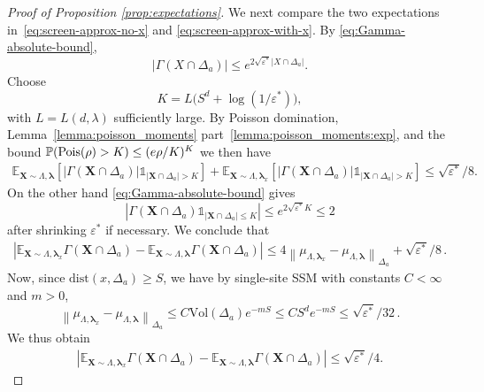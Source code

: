 \documentclass[10pt]{amsart}
\theoremstyle{definition}
\theoremstyle{remark}
\newcommand{\ind}[1]{\mathds{1}_{#1}}
\newcommand{\Pois}{\textup{Pois}}
\newcommand{\bX}{\mathbf{X}}
\newcommand{\dist}{\mathrm{dist}}
\renewcommand{\P}{\mathbb{P}}
\newcommand{\E}{\mathbb{E}}
\newcommand{\region}{\Lambda}
\newcommand{\activities}{\pmb{\lambda}}
\newcommand{\vol}{\mathrm{Vol}}
\newcommand{\absolute}[1]{\left\lvert#1\right\rvert}
\newcommand{\epsbound}{\varepsilon^{*}}
\begin{document}
\begin{proof}[Proof of Proposition \ref{prop:expectations}]
		We next compare the two expectations in~\eqref{eq:screen-approx-no-x} and \eqref{eq:screen-approx-with-x}. By \eqref{eq:Gamma-absolute-bound},
		\[
		|\Gamma(X\cap\Delta_a)|\le e^{2\sqrt{\epsbound} \absolute{X\cap\Delta_a}}.
		\]
		Choose
		\[
		K=L\big(S^d+\log(1/\epsbound)\big),
		\]
		with \(L=L(d,\lambda)\) sufficiently large. By Poisson domination, Lemma~\ref{lemma:poisson_moments} part~\ref{lemma:poisson_moments:exp}, and the bound
		\(
		\P(\Pois(\rho)>K)\leq (e\rho/K)^K
		\)
		we then have
		\begin{align}\label{eq:screen-tail}
			\E_{\bX\sim\region,\activities}
			\left[
			|\Gamma(\bX\cap\Delta_a)|
			\ind{\absolute{\bX\cap\Delta_a}>K}
			\right]
			+
			\E_{\bX\sim\region,\activities_x}
			\left[
			|\Gamma(\bX\cap\Delta_a)|
			\ind{\absolute{\bX\cap\Delta_a}>K}
			\right]
			\le
			\sqrt{\epsbound}/8 .
		\end{align}
		On the other hand \eqref{eq:Gamma-absolute-bound} gives
		\[
		\absolute{\Gamma(\bX\cap\Delta_a)\ind{\absolute{\bX\cap\Delta_a}\leq K}}
		\le
		e^{2\sqrt{\epsbound} K}
		\le 2
		\]
		after shrinking \(\epsbound\) if necessary. 
		We conclude that
		\begin{align*}
			\absolute{
				\E_{\bX\sim\region,\activities_x}
				\Gamma(\bX\cap\Delta_a)
				-
				\E_{\bX\sim\region,\activities}
				\Gamma(\bX\cap\Delta_a)
			}
			\le
			4
			\left\|{
				\mu_{\region,\activities_x}
				-
				\mu_{\region,\activities}
			}\right\|_{\Delta_a}
			+
			\sqrt{\epsbound}/8\, .
		\end{align*}
		Now, since \(\dist(x,\Delta_a)\ge S\), we have by single-site SSM with constants $C < \infty$ and $m > 0$,
		\[
		\left\|{
			\mu_{\region,\activities_x}
			-
			\mu_{\region,\activities}}\right\|_{\Delta_a}
		\le
		C\vol(\Delta_a)e^{-mS}
		\le
		C S^d e^{-mS} \leq \sqrt{\epsbound}/32\, .
		\]
		We thus obtain
		\begin{align}\label{eq:screen-expectation-comparison}
			\left|
			\E_{\bX\sim\region,\activities_x}
			\Gamma(\bX\cap\Delta_a)
			-
			\E_{\bX\sim\region,\activities}
			\Gamma(\bX\cap\Delta_a)
			\right|
			\le
			\sqrt{\epsbound}/4 .
		\end{align}
		

\end{proof}
\end{document}
